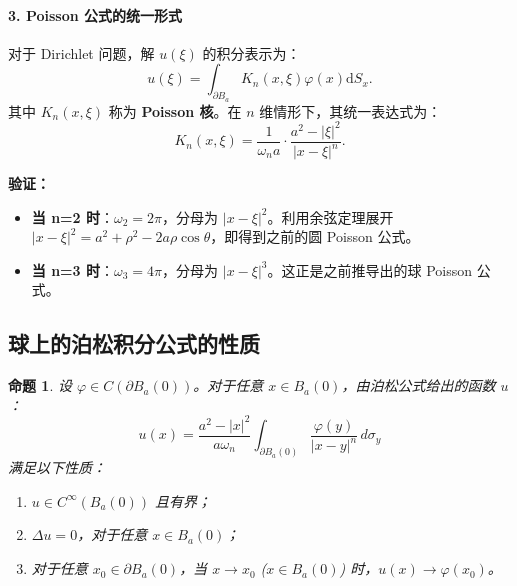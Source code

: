 \documentclass[12pt,a4paper]{ctexart}
\newtheorem{proposition}{命题}
\begin{document}
	\paragraph{3. Poisson 公式的统一形式}
	对于 Dirichlet 问题，解 $u(\xi)$ 的积分表示为：
	\begin{equation}
		u(\xi) = \int_{\partial B_a} K_n(x, \xi) \varphi(x) \mathrm{d}S_x.
	\end{equation}
	其中 $K_n(x, \xi)$ 称为 \textbf{Poisson 核}。在 $n$ 维情形下，其统一表达式为：
	\begin{equation}
		K_n(x, \xi) = \frac{1}{\omega_n a} \cdot \frac{a^2 - |\xi|^2}{|x-\xi|^n}.
	\end{equation}
	
	\textbf{验证：}
	\begin{itemize}
		\item \textbf{当 n=2 时}：$\omega_2 = 2\pi$，分母为 $|x-\xi|^2$。利用余弦定理展开 $|x-\xi|^2 = a^2 + \rho^2 - 2a\rho \cos\theta$，即得到之前的圆 Poisson 公式。
		\item \textbf{当 n=3 时}：$\omega_3 = 4\pi$，分母为 $|x-\xi|^3$。这正是之前推导出的球 Poisson 公式。
	\end{itemize}
	
	\subsection{球上的泊松积分公式的性质}
	
	\begin{proposition}
		设 $\varphi \in C(\partial B_a(0))$。对于任意 $x \in B_a(0)$，由泊松公式给出的函数 $u$：
		\begin{equation}
			u(x) = \frac{a^2 - |x|^2}{a \omega_n} \int_{\partial B_a(0)} \frac{\varphi(y)}{|x-y|^n} \, d\sigma_y
		\end{equation}
		满足以下性质：
		\begin{enumerate}
			\item $u \in C^\infty(B_a(0))$ 且有界；
			\item $\Delta u = 0$，对于任意 $x \in B_a(0)$；
			\item 对于任意 $x_0 \in \partial B_a(0)$，当 $x \to x_0$ ($x \in B_a(0)$) 时，$u(x) \to \varphi(x_0)$。
		\end{enumerate}
	\end{proposition}
	
\end{document}

